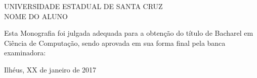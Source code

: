 
%
% 
%
\begin{folhadeaprovacao}


\begin{center}


            {UNIVERSIDADE ESTADUAL DE SANTA CRUZ} \\
           

    \vspace{1.5cm}
                                    {NOME DO ALUNO}\\
    \bfseries{}
\end{center}

Esta Monografia foi julgada adequada para a obten\c{c}\~{a}o do título  de Bacharel em Ciência de Computação, sendo aprovada em sua forma final  pela banca examinadora:

    \vspace{2.5cm}
    \vspace{3 cm}%

    \begin{center}
        Ilhéus, XX de janeiro de 2017
    \end{center}
  
\end{folhadeaprovacao}